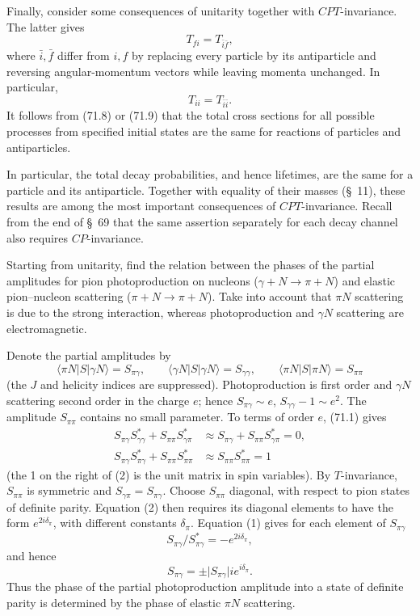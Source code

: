Finally, consider some consequences of unitarity together with $CPT$-invariance. The latter gives
\begin{equation}
T_{fi}=T_{\bar i\bar f},
\tag{71.16}
\end{equation}
where $\bar i,\bar f$ differ from $i,f$ by replacing every particle by its antiparticle and reversing angular-momentum vectors while leaving momenta unchanged. In particular,
\[
T_{ii}=T_{\bar i\bar i}.
\]
It follows from (71.8) or (71.9) that the total cross sections for all possible processes from specified initial states are the same for reactions of particles and antiparticles.

In particular, the total decay probabilities, and hence lifetimes, are the same for a particle and its antiparticle. Together with equality of their masses (\S~11), these results are among the most important consequences of $CPT$-invariance. Recall from the end of \S~69 that the same assertion separately for each decay channel also requires $CP$-invariance.

\ProblemHeading

Starting from unitarity, find the relation between the phases of the partial amplitudes for pion photoproduction on nucleons ($\gamma+N\to\pi+N$) and elastic pion--nucleon scattering ($\pi+N\to\pi+N$). Take into account that $\pi N$ scattering is due to the strong interaction, whereas photoproduction and $\gamma N$ scattering are electromagnetic.

\SolutionHeading Denote the partial amplitudes by
\[
\langle\pi N\vert S\vert\gamma N\rangle=S_{\pi\gamma},\qquad
\langle\gamma N\vert S\vert\gamma N\rangle=S_{\gamma\gamma},\qquad
\langle\pi N\vert S\vert\pi N\rangle=S_{\pi\pi}
\]
(the $J$ and helicity indices are suppressed). Photoproduction is first order and $\gamma N$ scattering second order in the charge $e$; hence $S_{\pi\gamma}\sim e$, $S_{\gamma\gamma}-1\sim e^2$. The amplitude $S_{\pi\pi}$ contains no small parameter. To terms of order $e$, (71.1) gives
\begin{align}
S_{\pi\gamma}S_{\gamma\gamma}^*+S_{\pi\pi}S_{\gamma\pi}^*
&\approx S_{\pi\gamma}+S_{\pi\pi}S_{\gamma\pi}^*=0,
\tag{1}\\
S_{\pi\gamma}S_{\pi\gamma}^*+S_{\pi\pi}S_{\pi\pi}^*
&\approx S_{\pi\pi}S_{\pi\pi}^*=1
\tag{2}
\end{align}
(the 1 on the right of (2) is the unit matrix in spin variables). By $T$-invariance, $S_{\pi\pi}$ is symmetric and $S_{\gamma\pi}=S_{\pi\gamma}$. Choose $S_{\pi\pi}$ diagonal, with respect to pion states of definite parity. Equation (2) then requires its diagonal elements to have the form $e^{2i\delta_\pi}$, with different constants $\delta_\pi$. Equation (1) gives for each element of $S_{\pi\gamma}$
\[
S_{\pi\gamma}/S_{\pi\gamma}^*=-e^{2i\delta_\pi},
\]
and hence
\[
S_{\pi\gamma}=\pm\lvert S_{\pi\gamma}\rvert i e^{i\delta_\pi}.
\]
Thus the phase of the partial photoproduction amplitude into a state of definite parity is determined by the phase of elastic $\pi N$ scattering.
